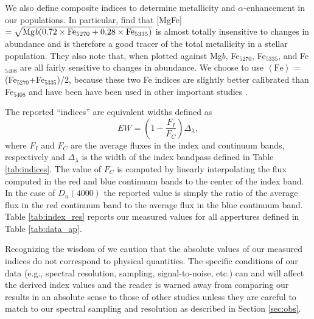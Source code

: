 We also define composite indices to determine metallicity and
$\alpha$-enhancement in our populations. In particular,
\citet{Thomas03} find that [MgFe] $= \sqrt{\mathrm{Mg
    \emph{b}}(0.72\times\mathrm{Fe}_{5270} +
  0.28\times\mathrm{Fe}_{5335})}$ is almost totally insensitive to
changes in abundance and is therefore a good tracer of the total
metallicity in a stellar population. They also note that, when plotted
against Mg$b$, Fe$_{5270}$, Fe$_{5335}$, and Fe$_{5408}$ are all
fairly sensitive to changes in abundance. We choose to use
$\left<\mathrm{Fe}\right>$ = (Fe$_{5270}$+Fe$_{5335}$)/2, because
these two Fe indices are slightly better calibrated than Fe$_{5408}$
\citep{Thomas03} and have been have been used in other important
studies \citep[e.g.,][]{Trager05,Trager08,Trager09}.

The reported ``indices'' are equivalent widths defined as
\begin{equation}
  EW = \left(1 - \frac{F_I}{F_C}\right)\Delta_{\lambda},
\end{equation}
where $F_I$ and $F_C$ are the average fluxes in the index and
continuum bands, respectively and $\Delta_{\lambda}$ is the width of
the index bandpass defined in Table \ref{tab:indices}. The value of
$F_C$ is computed by linearly interpolating the flux computed in the
red and blue continuum bands to the center of the index band. In the
case of $D_n(4000)$ the reported value is simply the ratio of the
average flux in the red continuum band to the average flux in the blue
continuum band. Table \ref{tab:index_res} reports our measured values
for all appertures defined in Table \ref{tab:data_ap}.

Recognizing the wisdom of \citet{Balogh99} we caution that the
absolute values of our measured indices do not correspond to physical
quantities. The specific conditions of our data (e.g., spectral
resolution, sampling, signal-to-noise, etc.) can and will affect the
derived index values and the reader is warned away from comparing our
results in an absolute sense to those of other studies unless they are
careful to match to our spectral sampling and resolution as described
in Section \ref{sec:obs}.

